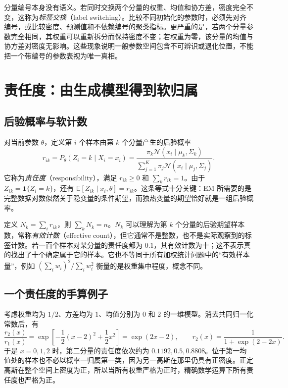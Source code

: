\documentclass[UTF8,12pt,a4paper,fontset=fandol]{ctexart}
\begin{document}
分量编号本身没有语义。若同时交换两个分量的权重、均值和协方差，密度完全不变，这称为\emph{标签交换}（label switching）。比较不同初始化的参数时，必须先对齐编号，或比较密度、预测值和不依赖编号的聚类指标。更严重的是，若两个分量参数完全相同，其权重可以重新拆分而保持密度不变；若权重为零，该分量的均值与协方差对密度无影响。这些现象说明一般参数空间包含不可辨识或退化位置，不能把一个带编号的参数表视为唯一真相。

\section{责任度：由生成模型得到软归属}
\label{sec:gmm-responsibility}

\subsection{后验概率与软计数}
对当前参数 $\theta$，定义第 $i$ 个样本由第 $k$ 个分量产生的后验概率
\begin{equation}
r_{ik}=P_\theta(Z_i=k\mid X_i=x_i)
=\frac{\pi_k\mathcal N(x_i\mid\mu_k,\Sigma_k)}{\sum_{j=1}^K\pi_j\mathcal N(x_i\mid\mu_j,\Sigma_j)}.
\label{eq:gmm-responsibility}
\end{equation}
它称为\emph{责任度}（responsibility），满足 $r_{ik}\geq0$ 和 $\sum_kr_{ik}=1$。由于 $Z_{ik}=\mathbf1\{Z_i=k\}$，还有 $\mathbb E[Z_{ik}\mid x_i,\theta]=r_{ik}$。这条等式十分关键：EM 所需要的是完整数据对数似然关于隐变量的条件期望，而独热变量的期望恰好就是一组后验概率。

定义 $N_k=\sum_i r_{ik}$，则 $\sum_kN_k=n$。$N_k$ 可以理解为第 $k$ 个分量的后验期望样本数，常称\emph{有效计数}（effective count），但它通常不是整数，也不是实际观察到的标签计数。若一百个样本对某分量的责任度都为 $0.1$，其有效计数为十；这不表示真的找出了十个确定属于它的样本。它也不等同于所有加权统计问题中的“有效样本量”，例如 $(\sum_iw_i)^2/\sum_iw_i^2$ 衡量的是权重集中程度，概念不同。

\subsection{一个责任度的手算例子}
考虑权重均为 $1/2$、方差均为 $1$、均值分别为 $0$ 和 $2$ 的一维模型。消去共同归一化常数后，有
\[
\frac{r_2(x)}{r_1(x)}
=\exp\!\left[-\frac12(x-2)^2+\frac12x^2\right]
=\exp(2x-2),
\qquad r_2(x)=\frac{1}{1+\exp(2-2x)}.
\]
于是 $x=0,1,2$ 时，第二分量的责任度依次约为 $0.1192,0.5,0.8808$。位于第一均值处的样本也不必以概率一归属第一类，因为另一高斯在那里仍具有正密度。正定高斯在整个空间上密度为正，所以当所有权重严格为正时，精确数学运算下所有责任度也严格为正。
\end{document}
